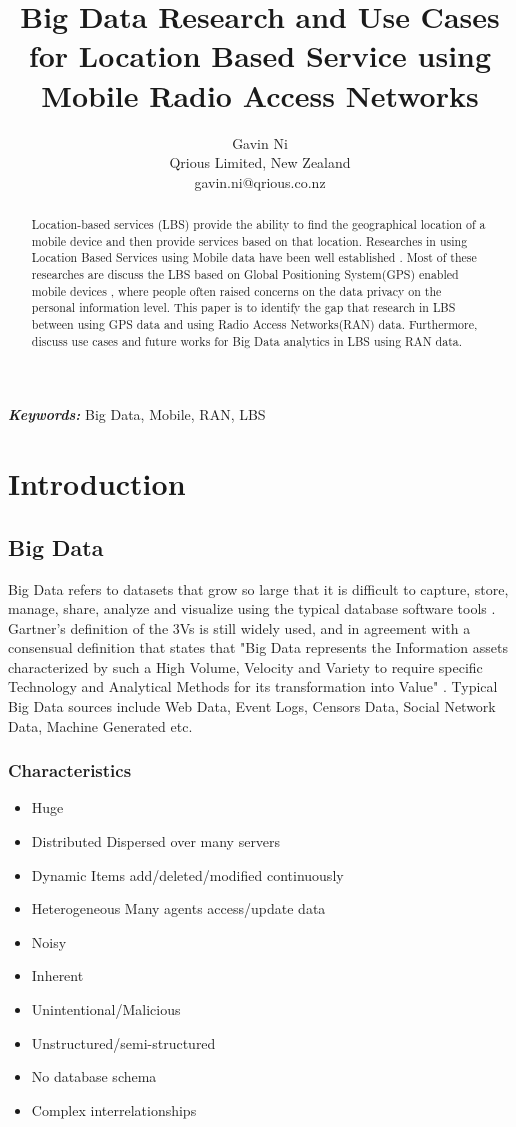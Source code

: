 \documentclass[11pt, oneside]{article}   	%
\title{Big Data Research and Use Cases for Location Based Service using Mobile Radio Access Networks}
\author{Gavin Ni \\Qrious Limited, New Zealand \\gavin.ni@qrious.co.nz}
\providecommand{\keywords}[1]{\textbf{\textit{Keywords:}} #1}
\begin{document}
\maketitle
\begin{abstract}
  Location-based services (LBS) provide the ability to find the geographical location of a mobile device and then provide services based on that location. Researches in using Location Based Services using Mobile data have been well established \fullcite{}. Most of these researches are discuss the LBS based on Global Positioning System(GPS) enabled mobile devices \fullcite{}, where people often raised concerns on the data privacy \fullcite{} on the personal information level. This paper is to identify the gap that research in LBS between using GPS data and using Radio Access Networks(RAN) data. Furthermore, discuss use cases and future works for Big Data analytics in LBS using RAN data.
\end{abstract}
\keywords{Big Data, Mobile, RAN, LBS}

\section{Introduction}

\subsection{Big Data}
Big Data refers to datasets that grow so large that it is difficult to capture, store, manage, share, analyze and visualize using the typical database software tools \fullcite{}.  Gartner's definition of the 3Vs is still widely used, and in agreement with a consensual definition that states that "Big Data represents the Information assets characterized by such a High Volume, Velocity and Variety to require specific Technology and Analytical Methods for its transformation into Value" \fullcite{}. Typical Big Data sources include Web Data, Event Logs, Censors Data, Social Network Data, Machine Generated etc.

\subsubsection{Characteristics}
\begin{itemize}
\item Huge
\item Distributed Dispersed over many servers 
\item Dynamic Items add/deleted/modified continuously
\item Heterogeneous Many agents access/update data
\item Noisy
\item Inherent
\item Unintentional/Malicious
\item Unstructured/semi-structured
\item No database schema
\item Complex interrelationships
\end{itemize}
\end{document}
